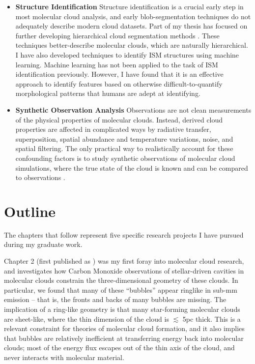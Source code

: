 \begin{itemize}
\item{\textbf{Structure Identification}} Structure identification is a crucial early step in most molecular cloud analysis, and early blob-segmentation techniques do not adequately describe modern cloud datasets. Part of my thesis has focused on further developing hierarchical cloud segmentation methods \citep{Rosolowsky08}. These techniques better-describe molecular clouds, which are naturally hierarchical. I have also developed techniques to identify ISM structures using machine learning. Machine learning has not been applied to the task of ISM identification previously. However, I have found that it is an effective approach to identify features based on otherwise difficult-to-quantify morphological patterns that humans are adept at identifying.
\item{\textbf{Synthetic Observation Analysis}} Observations are not clean measurements of the physical properties of molecular clouds. Instead, derived cloud properties are affected in complicated ways by radiative transfer, superposition, spatial abundance and temperature variations, noise, and spatial filtering. The only practical way to realistically account for these confounding factors is to study synthetic observations of molecular cloud simulations, where the true state of the cloud is known and can be compared to observations \citep{Goodman11}.
\end{itemize}

\section{Outline}
The chapters that follow represent five specific research projects I have pursued during my graduate work.

Chapter 2 (first published as \citealt{Beaumont10}) was my first foray into molecular cloud research, and investigates how Carbon Monoxide observations of stellar-driven cavities in molecular clouds constrain the three-dimensional geometry of these clouds. In particular, we found that many of these ``bubbles'' appear ringlike in sub-mm emission -- that is, the fronts and backs of many bubbles are missing. The implication of a ring-like geometry is that many star-forming molecular clouds are sheet-like, where the thin dimension of the cloud is $\lesssim$ 5pc thick. This is a relevant constraint for theories of molecular cloud formation, and it also implies that bubbles are relatively inefficient at transferring energy back into molecular clouds; most of the energy flux escapes out of the thin axis of the cloud, and never interacts with molecular material.

